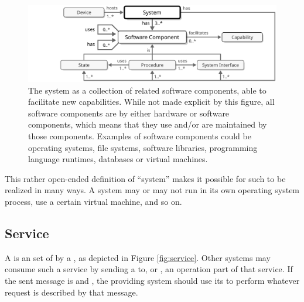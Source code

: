 \begin{figure}[ht!]
  \centering
  \includegraphics[scale=0.9]{figures/system}
  \caption{
    The system as a collection of related software components, able to facilitate new capabilities.
    While not made explicit by this figure, all software components are  by either hardware or software components, which means that they use and/or are maintained by those components.
    Examples of software components could be operating systems, file systems, software libraries, programming language runtimes, databases or virtual machines.
  }
  \label{fig:system}
\end{figure}

This rather open-ended definition of ``system'' makes it possible for such to be realized in many ways.
A system may or may not run in its own operating system process, use a certain virtual machine, and so on.

\subsection{Service}
\label{sec:concepts:service}

A  is an  set of   by a , as depicted in Figure \ref{fig:service}.
Other systems may consume such a service by sending a  to, or , an operation part of that service.
If the sent message is  and , the providing system should use its  to perform whatever request is described by that message.

\vfill

